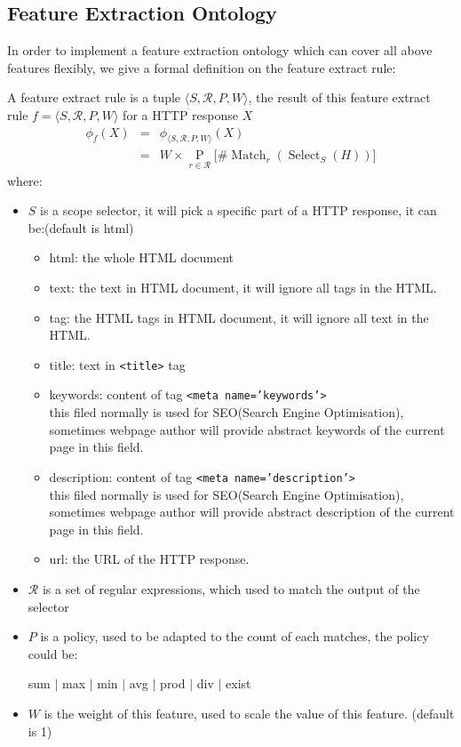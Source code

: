 \subsection{Feature Extraction Ontology}
In order to implement a feature extraction ontology which can cover all above features flexibly, we give a formal definition on the feature extract rule: 
\begin{defn}
A feature extract rule is a tuple $\langle S, \mathcal{R}, P, W \rangle$, the result of this feature extract rule $f=\langle S, \mathcal{R}, P, W \rangle$ for a HTTP response $X$
\begin{eqnarray}
	\phi_f(X) &=& \phi_{\langle S, \mathcal{R}, P, W \rangle}(X)\\
	&=& W \times \operatorname{P}\limits_{r \in \mathcal{R}}\lbrack \# \operatorname{Match}_r(\operatorname{Select}_S(H))\rbrack
\end{eqnarray}
where:
\begin{itemize}
	\item $S$ is a scope selector, it will pick a specific part of a HTTP response, it can be:(default is html)
		\begin{itemize}
			\item html: the whole HTML document
			\item text: the text in HTML document, it will ignore all tags in the HTML.
			\item tag: the HTML tags in HTML document, it will ignore all text in the HTML.
			\item title: text in \texttt{<title>} tag
			\item keywords: content of tag \texttt{<meta name='keywords'>}\\
			this filed normally is used for SEO(Search Engine Optimisation), sometimes webpage author will provide abstract keywords of the current page in this field. 
			\item description: content of tag \texttt{<meta name='description'>}\\
			this filed normally is used for SEO(Search Engine Optimisation), sometimes webpage author will provide abstract description of the current page in this field. 
			\item url: the URL of the HTTP response. 
		\end{itemize}
	\item $\mathcal{R}$ is a set of regular expressions, which used to match the output of the selector 
	\item $P$ is a policy, used to be adapted to the count of each matches, the policy could be:
		\begin{center}
			sum $\vert$ max $\vert$ min $\vert$ avg $\vert$ prod $\vert$ div $\vert$ exist
		\end{center}
	\item $W$ is the weight of this feature, used to scale the value of this feature. (default is 1)
\end{itemize}
\end{defn}

